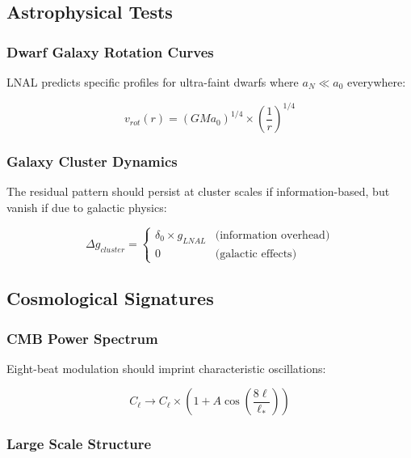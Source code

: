\documentclass[12pt,a4paper]{article}
\begin{document}
\subsection{Astrophysical Tests}

\subsubsection{Dwarf Galaxy Rotation Curves}

LNAL predicts specific profiles for ultra-faint dwarfs where $a_N \ll a_0$ everywhere:

\begin{equation}
v_{rot}(r) = (GMa_0)^{1/4} \times \left(\frac{1}{r}\right)^{1/4}
\end{equation}

\subsubsection{Galaxy Cluster Dynamics}

The residual pattern should persist at cluster scales if information-based, but vanish if due to galactic physics:

\begin{equation}
\Delta g_{cluster} = \begin{cases}
\delta_0 \times g_{LNAL} & \text{(information overhead)} \\
0 & \text{(galactic effects)}
\end{cases}
\end{equation}

\subsection{Cosmological Signatures}

\subsubsection{CMB Power Spectrum}

Eight-beat modulation should imprint characteristic oscillations:

\begin{equation}
C_\ell \to C_\ell \times \left(1 + A \cos\left(\frac{8\ell}{\ell_*}\right)\right)
\end{equation}

\subsubsection{Large Scale Structure}
\end{document}
